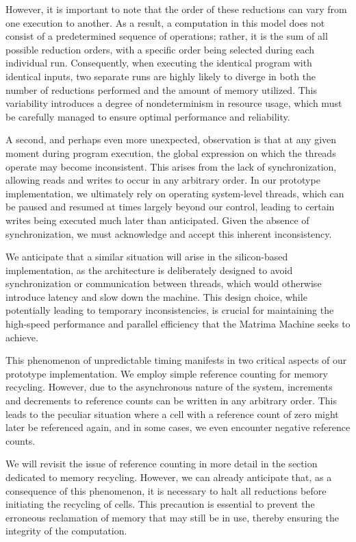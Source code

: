 \documentclass{IEEEtran}
\begin{document}
\par However, it is important to note that the order of these reductions can vary from one execution to another. As a result, a computation in this model does not consist of a predetermined sequence of operations; rather, it is the sum of all possible reduction orders, with a specific order being selected during each individual run. Consequently, when executing the identical program with identical inputs, two separate runs are highly likely to diverge in both the number of reductions performed and the amount of memory utilized. This variability introduces a degree of nondeterminism in resource usage, which must be carefully managed to ensure optimal performance and reliability.

\par A second, and perhaps even more unexpected, observation is that at any given moment during program execution, the global expression on which the threads operate may become inconsistent. This arises from the lack of synchronization, allowing reads and writes to occur in any arbitrary order. In our prototype implementation, we ultimately rely on operating system-level threads, which can be paused and resumed at times largely beyond our control, leading to certain writes being executed much later than anticipated. Given the absence of synchronization, we must acknowledge and accept this inherent inconsistency.

\par We anticipate that a similar situation will arise in the silicon-based implementation, as the architecture is deliberately designed to avoid synchronization or communication between threads, which would otherwise introduce latency and slow down the machine. This design choice, while potentially leading to temporary inconsistencies, is crucial for maintaining the high-speed performance and parallel efficiency that the Matrima Machine seeks to achieve.

\par This phenomenon of unpredictable timing manifests in two critical aspects of our prototype implementation. We employ simple reference counting for memory recycling. However, due to the asynchronous nature of the system, increments and decrements to reference counts can be written in any arbitrary order. This leads to the peculiar situation where a cell with a reference count of zero might later be referenced again, and in some cases, we even encounter negative reference counts.

\par We will revisit the issue of reference counting in more detail in the section dedicated to memory recycling. However, we can already anticipate that, as a consequence of this phenomenon, it is necessary to halt all reductions before initiating the recycling of cells. This precaution is essential to prevent the erroneous reclamation of memory that may still be in use, thereby ensuring the integrity of the computation.
\end{document}
